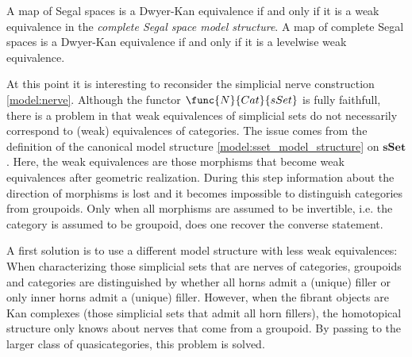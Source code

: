     \begin{property}
        A map of Segal spaces is a Dwyer-Kan equivalence if and only if it is a weak equivalence in the \textit{complete Segal space model structure}. A map of complete Segal spaces is a Dwyer-Kan equivalence if and only if it is a levelwise weak equivalence.
    \end{property}

    At this point it is interesting to reconsider the simplicial nerve construction \ref{model:nerve}. Although the functor $\func{N}{Cat}{sSet}$ is fully faithfull, there is a problem in that weak equivalences of simplicial sets do not necessarily correspond to (weak) equivalences of categories. The issue comes from the definition of the canonical model structure \ref{model:sset_model_structure} on $\mathbf{sSet}$. Here, the weak equivalences are those morphisms that become weak equivalences after geometric realization. During this step information about the direction of morphisms is lost and it becomes impossible to distinguish categories from groupoids. Only when all morphisms are assumed to be invertible, i.e. the category is assumed to be groupoid, does one recover the converse statement.

    A first solution is to use a different model structure with less weak equivalences:
    When characterizing those simplicial sets that are nerves of categories, groupoids and categories are distinguished by whether all horns admit a (unique) filler or only inner horns admit a (unique) filler. However, when the fibrant objects are Kan complexes (those simplicial sets that admit all horn fillers), the homotopical structure only knows about nerves that come from a groupoid. By passing to the larger class of quasicategories, this problem is solved.

